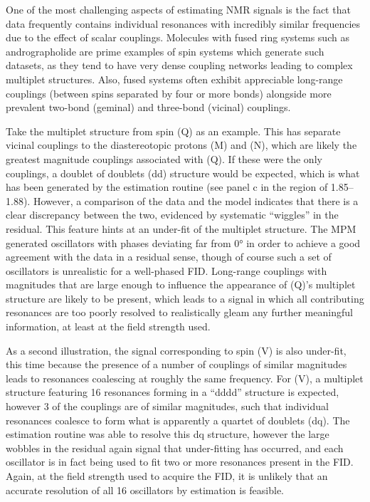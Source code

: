 One of the most challenging aspects of estimating \ac{NMR} signals is
the fact that data frequently contains individual resonances with incredibly
similar frequencies due to the effect of scalar couplings. Molecules
with fused ring systems such as andrographolide are prime examples of spin
systems which generate such datasets, as they tend to have very dense coupling
networks leading to complex multiplet structures. Also, fused systems often
exhibit appreciable long-range couplings (between spins separated by four or more bonds) alongside more prevalent two-bond (geminal) and three-bond (vicinal) couplings.

Take the multiplet structure from spin (Q) as an example.
This has separate vicinal couplings to the
diastereotopic protons (M) and (N), which are likely the greatest magnitude couplings
associated with (Q). If these were the only couplings, a doublet of doublets
(dd) structure would be expected, which is what has been generated by
the estimation routine (see panel c in the region of
\SIrange{1.85}{1.88}{\partspermillion}). However, a comparison of the data and
the model indicates that there is a clear discrepancy between the two,
evidenced by systematic ``wiggles'' in the residual. This feature hints at an
under-fit of the multiplet structure.
The \ac{MPM} generated oscillators with phases deviating far from \ang{0} in
order to achieve a good agreement with the data in a residual sense, though of
course such a set of oscillators is unrealistic for a well-phased \ac{FID}.
Long-range couplings with magnitudes that are large enough to influence the
appearance of (Q)'s multiplet structure are likely to be present, which leads
to a signal in which all contributing resonances are too poorly resolved to
realistically gleam any further meaningful information, at least at the field
strength used.

As a second illustration, the signal corresponding to spin (V) is also
under-fit, this time because the presence of a number of couplings of similar
magnitudes leads to resonances coalescing at roughly the same frequency. For
(V), a multiplet structure featuring 16 resonances forming in a ``dddd''
structure is expected, however 3 of the couplings are of similar magnitudes,
such that individual resonances coalesce to form what is apparently a quartet
of doublets (dq). The estimation routine was able to resolve this dq structure,
however the large wobbles in the residual again signal that under-fitting has
occurred, and each oscillator is in fact being used to fit two or more
resonances present in the \ac{FID}. Again, at the field strength used to
acquire the \ac{FID}, it is unlikely that an accurate resolution of all 16
oscillators by estimation is feasible.

